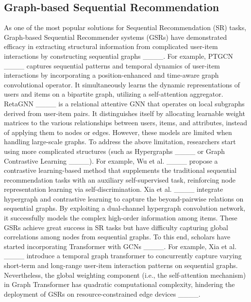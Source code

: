 \subsection{Graph-based Sequential Recommendation}
\noindent As one of the most popular solutions for Sequential Recommendation (SR) tasks, Graph-based Sequential Recommender systems (GSRs) have demonstrated efficacy in extracting structural information from complicated user-item interactions by constructing sequential graphs ____. For example, PTGCN ____ captures sequential patterns and temporal dynamics of user-item interactions by incorporating a position-enhanced and time-aware graph convolutional operator. It simultaneously learns the dynamic representations of users and items on a bipartite graph, utilizing a self-attention aggregator. RetaGNN ____ is a relational attentive GNN that operates on local subgraphs derived from user-item pairs. It distinguishes itself by allocating learnable weight matrices to the various relationships between users, items, and attributes, instead of applying them to nodes or edges.
However, these models are limited when handling large-scale graphs. 
To address the above limitation, researchers start using more complicated structures (such as Hypergraphs ____ or Graph Contrastive Learning ____).
For example, Wu et al. ____ propose a contrastive learning-based method that supplements the traditional sequential recommendation tasks with an auxiliary self-supervised task, reinforcing node representation learning via self-discrimination.
Xia et al. ____ integrate hypergraph and contrastive learning to capture the beyond-pairwise relations on sequential graphs. By exploiting a dual-channel hypergraph convolution network, it successfully models the complex high-order information among items. 
These GSRs achieve great success in SR tasks but have difficulty capturing global correlations among nodes from sequential graphs. To this end, scholars have started incorporating Transformer with GCNs ____. For example, Xia et al. ____ introduce a temporal graph transformer to concurrently capture varying short-term and long-range user-item interaction patterns on sequential graphs. Nevertheless, the global weighting component (i.e., the self-attention mechanism) in Graph Transformer has quadratic computational complexity, hindering the deployment of GSRs on resource-constrained edge devices ____.

